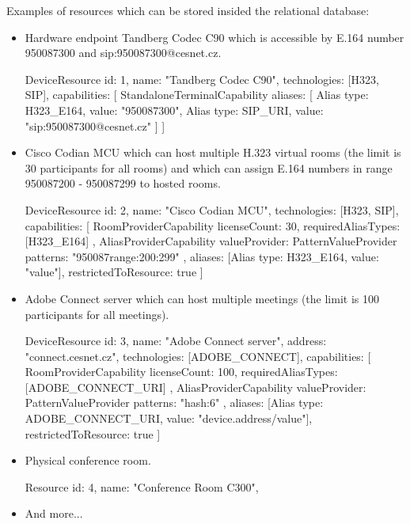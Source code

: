 Examples of resources which can be stored insided the relational database:

\begin{itemize}

\item Hardware endpoint Tandberg Codec C90 which is accessible by E.164 number 950087300 and sip:950087300@cesnet.cz.
\begin{Entity}
DeviceResource {
  id: 1,
  name: "Tandberg Codec C90",
  technologies: [H323, SIP],
  capabilities: [
    StandaloneTerminalCapability {
      aliases: [
        Alias { type: H323_E164, value: "950087300"},
        Alias { type: SIP_URI,   value: "sip:950087300@cesnet.cz"}
      ]
    }
  ] 
}
\end{Entity}

\newpage
\item Cisco Codian MCU which can host multiple H.323 virtual rooms (the limit is 30 participants for all rooms) and which can assign E.164 numbers in range 950087200 - 950087299 to hosted rooms.
\begin{Entity}
DeviceResource {
  id: 2,
  name: "Cisco Codian MCU",
  technologies: [H323, SIP],
  capabilities: [
    RoomProviderCapability {
      licenseCount: 30,
      requiredAliasTypes: [H323_E164]
    },
    AliasProviderCapability {
      valueProvider: PatternValueProvider {
        patterns: "950087{range:200:299}"
      },
      aliases: [Alias { type: H323_E164, value: "{value}"}],
      restrictedToResource: true 
    }
  ]
}
\end{Entity}

\item Adobe Connect server which can host multiple meetings (the limit is 100 participants for all meetings).
\begin{Entity}
DeviceResource {
  id: 3,
  name: "Adobe Connect server",
  address: "connect.cesnet.cz",
  technologies: [ADOBE_CONNECT],
  capabilities: [
    RoomProviderCapability {
      licenseCount: 100,
      requiredAliasTypes: [ADOBE_CONNECT_URI]
    },
    AliasProviderCapability {
      valueProvider: PatternValueProvider {
        patterns: "{hash:6}"
      },
      aliases: [Alias { type: ADOBE_CONNECT_URI, value: "{device.address}/{value}"}],
      restrictedToResource: true 
    }
  ]
}
\end{Entity}

\item Physical conference room.

\begin{Entity}
Resource {
  id: 4,
  name: "Conference Room C300",
}
\end{Entity}

\item And more...

\end{itemize}



